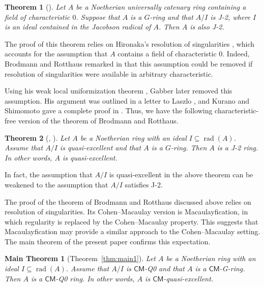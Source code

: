 \documentclass[a4paper, 11pt]{amsart}
\newtheorem{theorem}{Theorem}[section]
\newtheorem*{main}{Main Theorem}
\theoremstyle{definition}
\newcommand{\rad}{\operatorname{rad}}
\let\subset\subseteq
\begin{document}
\begin{theorem}[{\cite[Theorem~2]{BR80}}]
    Let $A$ be a Noetherian universally catenary ring containing a field of characteristic $0$. Suppose that $A$ is a $G$-ring and that $A/I$ is \textup{J-2}, where $I$ is an ideal contained in the Jacobson radical of $A$. Then $A$ is also \textup{J-2}.
\end{theorem}

The proof of this theorem relies on Hironaka's resolution of singularities \cite{Hir64}, which accounts for the assumption that $A$ contains a field of characteristic $0$. Indeed, Brodmann and Rotthaus remarked in \cite[p.~81]{BR80} that this assumption could be removed if resolution of singularities were available in arbitrary characteristic.

Using his weak local uniformization theorem \cite[Expos\'e~VII, Th\'eor\`eme~1.1]{ILO14}, Gabber later removed this assumption. His argument was outlined in a letter to Laszlo \cite{Gabber2007}, and Kurano and Shimomoto gave a complete proof in \cite{KS21}. Thus, we have the following characteristic-free version of the theorem of Brodmann and Rotthaus.

\begin{theorem}[{\cite{Gabber2007}, \cite[Theorem~4.1]{KS21}}]
    Let $A$ be a Noetherian ring with an ideal $I \subseteq \operatorname{rad}(A)$. Assume that $A/I$ is quasi-excellent and that $A$ is a $G$-ring. Then $A$ is a \textup{J-2} ring. In other words, $A$ is quasi-excellent.
\end{theorem}

In fact, the assumption that $A/I$ is quasi-excellent in the above theorem can be weakened to the assumption that $A/I$ satisfies J-2.

The proof of the theorem of Brodmann and Rotthaus discussed above relies on resolution of singularities. Its Cohen--Macaulay version is Macaulayfication, in which regularity is replaced by the Cohen--Macaulay property. This suggests that Macaulayfication may provide a similar approach to the Cohen--Macaulay setting. The main theorem of the present paper confirms this expectation. 

\begin{main}[Theorem~\ref{thm:main1}]
    Let $A$ be a Noetherian ring with an ideal $I \subset \rad(A)$. Assume that $A/I$ is $\mathsf{CM}$\textup{-Q0} and that $A$ is a $\mathsf{CM}$\textnormal{-G-}ring. Then $A$ is a $\mathsf{CM}$\textnormal{-Q0} ring. In other words, $A$ is $\mathsf{CM}$-quasi-excellent.
\end{main}
\end{document}

